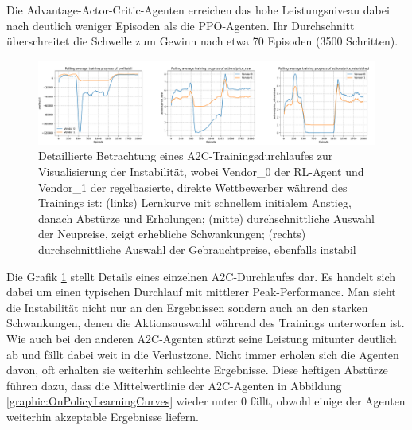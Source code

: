 Die Advantage-Actor-Critic-Agenten erreichen das hohe Leistungsniveau dabei nach deutlich weniger Episoden als die PPO-Agenten.
Ihr Durchschnitt überschreitet die Schwelle zum Gewinn nach etwa 70 Episoden (3500 Schritten).
\begin{figure}[htbp]
	\centering
	\includegraphics[width=\textwidth]{main/a2c_detailed_analysis.pdf}
	\caption{
		Detaillierte Betrachtung eines A2C-Trainingsdurchlaufes zur Visualisierung der Instabilität, wobei Vendor\_0 der RL-Agent und Vendor\_1 der regelbasierte, direkte Wettbewerber während des Trainings ist:
		(links) Lernkurve mit schnellem initialem Anstieg, danach Abstürze und Erholungen;
		(mitte) durchschnittliche Auswahl der Neupreise, zeigt erhebliche Schwankungen;
		(rechts) durchschnittliche Auswahl der Gebrauchtpreise, ebenfalls instabil
	}
	\label{graphic:A2CInstability}
\end{figure}
Die Grafik \ref{graphic:A2CInstability} stellt Details eines einzelnen A2C-Durchlaufes dar.
Es handelt sich dabei um einen typischen Durchlauf mit mittlerer Peak-Performance.
Man sieht die Instabilität nicht nur an den Ergebnissen sondern auch an den starken Schwankungen, denen die Aktionsauswahl während des Trainings unterworfen ist.
Wie auch bei den anderen A2C-Agenten stürzt seine Leistung mitunter deutlich ab und fällt dabei weit in die Verlustzone.
Nicht immer erholen sich die Agenten davon, oft erhalten sie weiterhin schlechte Ergebnisse.
Diese heftigen Abstürze führen dazu, dass die Mittelwertlinie der A2C-Agenten in Abbildung \ref{graphic:OnPolicyLearningCurves} wieder unter 0 fällt, obwohl einige der Agenten weiterhin akzeptable Ergebnisse liefern.

